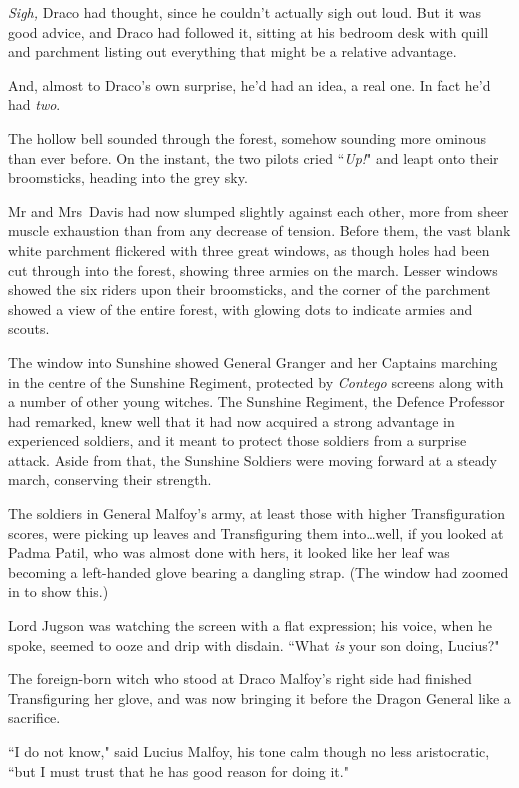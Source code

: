 \emph{Sigh,} Draco had thought, since he couldn't actually sigh out loud. But it was good advice, and Draco had followed it, sitting at his bedroom desk with quill and parchment listing out everything that might be a relative advantage.

And, almost to Draco's own surprise, he'd had an idea, a real one. In fact he'd had \emph{two}.

The hollow bell sounded through the forest, somehow sounding more ominous than ever before. On the instant, the two pilots cried ``\emph{Up!}" and leapt onto their broomsticks, heading into the grey sky.

\later

Mr and Mrs~Davis had now slumped slightly against each other, more from sheer muscle exhaustion than from any decrease of tension. Before them, the vast blank white parchment flickered with three great windows, as though holes had been cut through into the forest, showing three armies on the march. Lesser windows showed the six riders upon their broomsticks, and the corner of the parchment showed a view of the entire forest, with glowing dots to indicate armies and scouts.

The window into Sunshine showed General Granger and her Captains marching in the centre of the Sunshine Regiment, protected by \emph{Contego} screens along with a number of other young witches. The Sunshine Regiment, the Defence Professor had remarked, knew well that it had now acquired a strong advantage in experienced soldiers, and it meant to protect those soldiers from a surprise attack. Aside from that, the Sunshine Soldiers were moving forward at a steady march, conserving their strength.

The soldiers in General Malfoy's army, at least those with higher Transfiguration scores, were picking up leaves and Transfiguring them into…well, if you looked at Padma Patil, who was almost done with hers, it looked like her leaf was becoming a left-handed glove bearing a dangling strap. (The window had zoomed in to show this.)

Lord Jugson was watching the screen with a flat expression; his voice, when he spoke, seemed to ooze and drip with disdain. ``What \emph{is} your son doing, Lucius?"

The foreign-born witch who stood at Draco Malfoy's right side had finished Transfiguring her glove, and was now bringing it before the Dragon General like a sacrifice.

``I do not know," said Lucius Malfoy, his tone calm though no less aristocratic, ``but I must trust that he has good reason for doing it."

